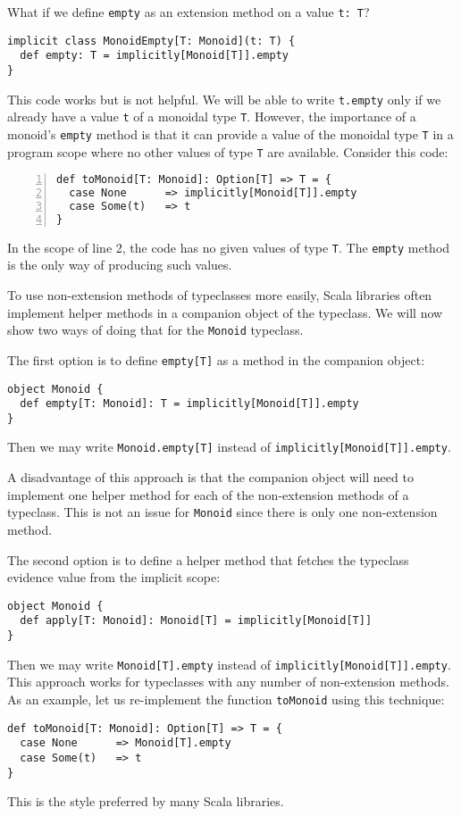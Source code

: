 What if we define \lstinline!empty! as an extension method on a value
\lstinline!t: T!?
\begin{lstlisting}
implicit class MonoidEmpty[T: Monoid](t: T) {
  def empty: T = implicitly[Monoid[T]].empty
}
\end{lstlisting}
This code works but is not helpful. We will be able to write \lstinline!t.empty!
only if we already have a value \lstinline!t! of a monoidal type
\lstinline!T!. However, the importance of a monoid\textsf{'}s \lstinline!empty!
method is that it can provide a value of the monoidal type \lstinline!T!
in a program scope where no other values of type \lstinline!T! are
available. Consider this code:
\begin{lstlisting}[numbers=left]
def toMonoid[T: Monoid]: Option[T] => T = {
  case None      => implicitly[Monoid[T]].empty
  case Some(t)   => t
}
\end{lstlisting}
In the scope of line 2, the code has no given values of type \lstinline!T!.
The \lstinline!empty! method is the only way of producing such values.

To use non-extension methods of typeclasses more easily, Scala libraries
often implement helper methods in a companion object of the typeclass.
We will now show two ways of doing that for the \lstinline!Monoid!
typeclass. 

The first option is to define \lstinline!empty[T]! as a method in
the companion object:
\begin{lstlisting}
object Monoid {
  def empty[T: Monoid]: T = implicitly[Monoid[T]].empty
}
\end{lstlisting}
Then we may write \lstinline!Monoid.empty[T]! instead of \lstinline!implicitly[Monoid[T]].empty!.

A disadvantage of this approach is that the companion object will
need to implement one helper method for each of the non-extension
methods of a typeclass. This is not an issue for \lstinline!Monoid!
since there is only one non-extension method.

The second option is to define a helper method that fetches the typeclass
evidence value from the implicit scope:
\begin{lstlisting}
object Monoid {
  def apply[T: Monoid]: Monoid[T] = implicitly[Monoid[T]]
}
\end{lstlisting}
Then we may write \lstinline!Monoid[T].empty! instead of \lstinline!implicitly[Monoid[T]].empty!.
This approach works for typeclasses with any number of non-extension
methods. As an example, let us re-implement the function \lstinline!toMonoid!
using this technique:
\begin{lstlisting}
def toMonoid[T: Monoid]: Option[T] => T = {
  case None      => Monoid[T].empty
  case Some(t)   => t
}
\end{lstlisting}
This is the style preferred by many Scala libraries. 

